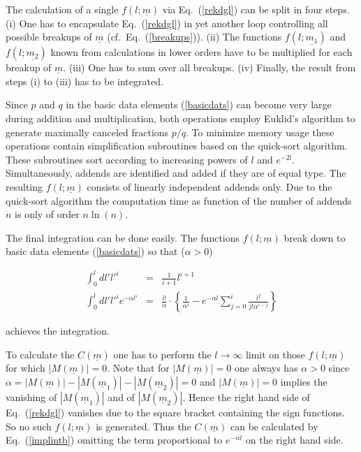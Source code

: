 The calculation of a single $f(l;\underline{m})$ via Eq.~(\ref{rekdgl}) can be 
split in four steps. (i) One has to encapsulate Eq.~(\ref{rekdgl}) in 
yet another loop controlling all possible breakups of $\underline{m}$ 
(cf.~Eq.~(\ref{breakups})). (ii) The functions $f(l;\underline{m_1})$ and 
$f(l;\underline{m_2})$ known from calculations in lower orders have to be
 multiplied for each breakup of $\underline{m}$. (iii) One has to sum over all
 breakups. (iv) Finally, the result from steps (i) to (iii) has to be 
integrated.


Since $p$ and $q$ in the basic data elements 
(\ref{basicdats}) can become very large during addition and multiplication, 
both operations employ Euklid's algorithm to generate maximally canceled 
fractions ${p}/{q}$. To minimize memory usage these operations contain 
simplification subroutines based on the quick-sort algorithm. 
These subroutines sort according to 
increasing powers of $l$ and $e^{-2l}$. Simultaneously, addends are
 identified and added if they are of equal type.
The resulting $f(l;\underline{m})$ consists of linearly independent addends 
only. Due to the quick-sort algorithm the computation time as function of 
the number of addends $n$ is only of order $n\ln(n)$. 

The final integration can be done easily. The functions $f(l;\underline{m})$ 
 break down to basic data elements (\ref{basicdats}) so that ($\alpha>0$)
\begin{mathletters}
\begin{eqnarray}
  \label{implinta}
  \int_0^l dl' l'^i &=& \frac{1}{i+1}l^{i+1}\\
  \label{implintb}
  \int_0^l dl' l'^i e^{-\alpha l'} &=& 
\frac{i!}{\alpha}\cdot\left\{\frac{1}{\alpha^i}-
e^{-\alpha l}\sum_{j=0}^i\frac{l^j}{j! \alpha^{i-j}}\right\}
\end{eqnarray}
\end{mathletters}
achieves the integration.

To calculate the $C(\underline{m})$ one has to perform the 
$l \rightarrow \infty$ limit on those $f(l;\underline{m})$ for which 
$|M(\underline{m})|=0$. Note that for $|M(\underline{m})|=0$ one always has 
$\alpha>0$ since  $\alpha =|M(\underline{m})|-|M(\underline{m}_1)|
-|M(\underline{m}_2)|=0$  and $|M(\underline{m})|=0$ implies
the vanishing of $|M(\underline{m}_1)|$ and of $|M(\underline{m}_2)|$.
Hence the right hand side of Eq.~(\ref{rekdgl}) vanishes due to the 
square bracket containing the sign functions. So no such
$f(l;\underline{m})$ is generated. Thus the 
$C(\underline{m})$ can be calculated by Eq.~(\ref{implintb}) omitting the 
term proportional to $e^{-\alpha l}$ on the right hand side.

